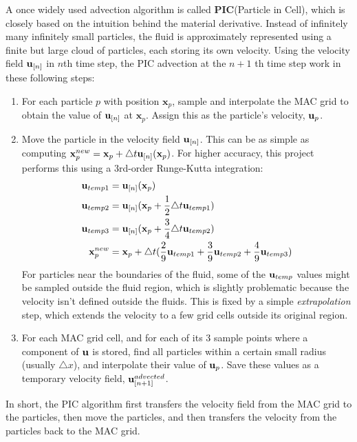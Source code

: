 A once widely used advection algorithm is called \textbf{PIC}(Particle in Cell), which is closely based on the intuition behind the material derivative. Instead of infinitely many infinitely small particles, the fluid is approximately represented using a finite but large cloud of particles, each storing its own velocity. Using the velocity field $\textbf{u}_{[n]}$ in $n$th time step, the PIC advection at the $n+1$ th time step work in these following steps: 

\begin{enumerate}
    \item For each particle $p$ with position $\textbf{x}_p$, sample and interpolate the MAC grid to obtain the value of $\textbf{u}_{[n]}$ at $\textbf{x}_p$. Assign this as the particle's velocity,  $\textbf{u}_p$.
    
    \item Move the particle in the velocity field $\textbf{u}_{[n]}$. This can be as simple as computing $\textbf{x}_p^{new} = \textbf{x}_p + \triangle t \textbf{u}_{[n]}(\textbf{x}_p)$. For higher accuracy, this project performs this using a 3rd-order Runge-Kutta integration:
    \begin{equation*}
        \begin{aligned}
            \textbf{u}_{temp1} &= \textbf{u}_{[n]}(\textbf{x}_p) \\
            \textbf{u}_{temp2} &= \textbf{u}_{[n]}(\textbf{x}_p + \frac{1}{2}\triangle t \textbf{u}_{temp1}) \\
            \textbf{u}_{temp3} &= \textbf{u}_{[n]}(\textbf{x}_p + \frac{3}{4}\triangle t \textbf{u}_{temp2})\\
            \textbf{x}_p^{new} &=  \textbf{x}_p + \triangle t(
                \frac{2}{9}\textbf{u}_{temp1} + \frac{3}{9}\textbf{u}_{temp2} + \frac{4}{9}\textbf{u}_{temp3}
                )
        \end{aligned}
    \end{equation*}
    For particles near the boundaries of the fluid, some of the $\textbf{u}_{temp}$ values might be sampled outside the fluid region, which is slightly problematic because the velocity isn't defined outside the fluids. This is fixed by a simple \textit{extrapolation} step, which extends the velocity to a few grid cells outside its original region.
    
    
    \item For each MAC grid cell, and for each of its 3 sample points where a component of $\textbf{u}$ is stored, find all particles within a certain small radius (usually $\triangle x$), and interpolate their value of $\textbf{u}_p$. Save these values as a temporary velocity field, $\textbf{u}_{[n+1]}^{advected}$.
\end{enumerate}
In short, the PIC algorithm first transfers the velocity field from the MAC grid to the particles, then move the particles, and then transfers the velocity from the particles back to the MAC grid.




